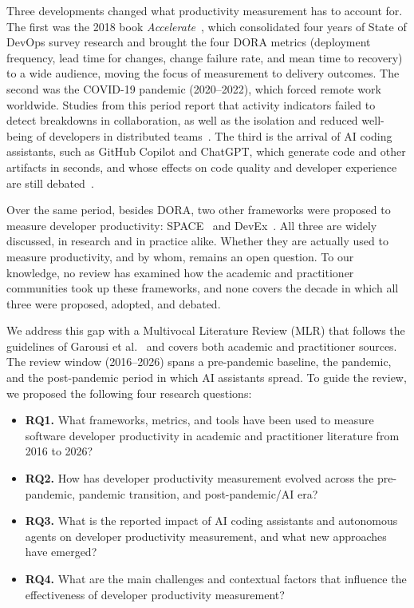 \documentclass[preprint,number]{elsarticle}
\begin{document}
Three developments changed what productivity measurement has to account for. The first was the 2018 book \textit{Accelerate}~\cite{forsgren2018accelerate}, which consolidated four years of State of DevOps survey research and brought the four DORA metrics (deployment frequency, lead time for changes, change failure rate, and mean time to recovery) to a wide audience, moving the focus of measurement to delivery outcomes. The second was the COVID-19 pandemic (2020--2022), which forced remote work worldwide. Studies from this period report that activity indicators failed to detect breakdowns in collaboration, as well as the isolation and reduced well-being of developers in distributed teams~\cite{ralph2020pandemic, P1503}. The third is the arrival of AI coding assistants, such as GitHub Copilot and ChatGPT, which generate code and other artifacts in seconds, and whose effects on code quality and developer experience are still debated~\cite{P2032, P0244}.

Over the same period, besides DORA, two other frameworks were proposed to measure developer productivity: SPACE~\cite {P1259} and DevEx~\cite{P1280}. All three are widely discussed, in research and in practice alike. Whether they are actually used to measure productivity, and by whom, remains an open question. To our knowledge, no review has examined how the academic and practitioner communities took up these frameworks, and none covers the decade in which all three were proposed, adopted, and debated.

We address this gap with a Multivocal Literature Review (MLR) that follows the guidelines of Garousi et al.~\cite{garousi2019mlr} and covers both academic and practitioner sources. The review window (2016--2026) spans a pre-pandemic baseline, the pandemic, and the post-pandemic period in which AI assistants spread. To guide the review, we proposed the following four research questions:

\begin{itemize}[leftmargin=*, itemsep=2pt]
  \item \textbf{RQ1.} What frameworks, metrics, and tools have been used to measure software developer productivity in academic and practitioner literature from 2016 to 2026?
  \item \textbf{RQ2.} How has developer productivity measurement evolved across the pre-pandemic, pandemic transition, and post-pandemic/AI era?
  \item \textbf{RQ3.} What is the reported impact of AI coding assistants and autonomous agents on developer productivity measurement, and what new approaches have emerged?
  \item \textbf{RQ4.} What are the main challenges and contextual factors that influence the effectiveness of developer productivity measurement?
\end{itemize}
\end{document}
